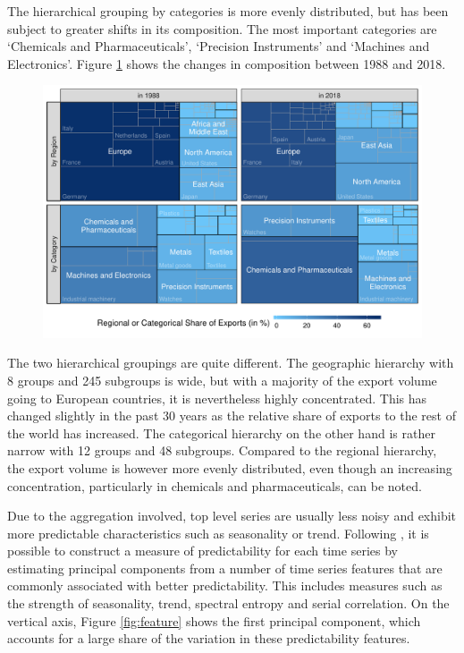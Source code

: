 \documentclass[a4paper,fleqn,11pt]{article}
\begin{document}
The hierarchical grouping by categories is more evenly distributed, but has been subject to greater shifts in its composition. The most important categories are `Chemicals and Pharmaceuticals', `Precision Instruments' and `Machines and Electronics'. Figure \ref{fig:treemap} shows the changes in composition between 1988 and 2018.

\begin{figure}[H]
	\includegraphics[width=\textwidth]{fig/fig_treemap}
	\label{fig:treemap}
\end{figure}

The two hierarchical groupings are quite different. The geographic hierarchy with 8 groups and 245 subgroups is wide, but with a majority of the export volume going to European countries, it is nevertheless highly concentrated. This has changed slightly in the past 30 years as the relative share of exports to the rest of the world has increased. The categorical hierarchy on the other hand is rather narrow with 12 groups and 48 subgroups. Compared to the regional hierarchy, the export volume is however more evenly distributed, even though an increasing concentration, particularly in chemicals and pharmaceuticals, can be noted.

Due to the aggregation involved, top level series are usually less noisy and exhibit more predictable characteristics such as seasonality or trend. Following \cite{Kang2017}, it is possible to construct a measure of predictability for each time series by estimating principal components from a number of time series features that are commonly associated with better predictability. This includes measures such as the strength of seasonality, trend, spectral entropy and serial correlation. On the vertical axis, Figure \ref{fig:feature} shows the first principal component, which accounts for a large share of the variation in these predictability features.
\end{document}
